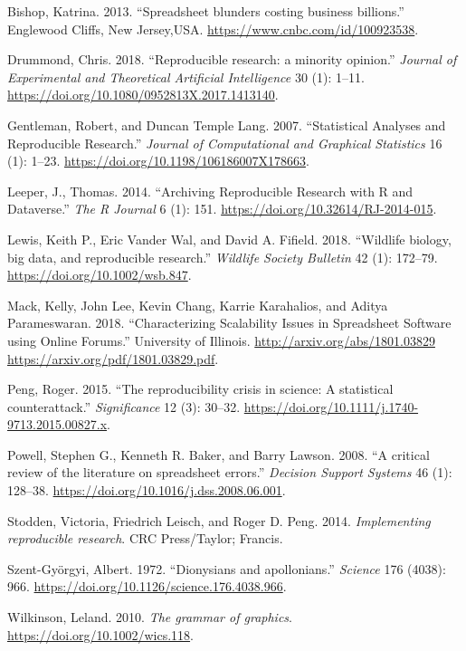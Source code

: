\documentclass[smallextended]{svjour3}       %
\newlength{\cslhangindent}
\newlength{\cslentryspacingunit} %
\newenvironment{CSLReferences}[2] %
 {%
  \setlength{\parindent}{0pt}
  \ifodd #1
  \let\oldpar\par
  \def\par{\hangindent=\cslhangindent\oldpar}
  \fi
  \setlength{\parskip}{#2\cslentryspacingunit}
 }%
 {}
\begin{document}
\hypertarget{refs}{}
\begin{CSLReferences}{1}{0}
\leavevmode{}%
Bishop, Katrina. 2013. {``{Spreadsheet blunders costing business
billions}.''} Englewood Cliffs, New Jersey,USA.
\url{https://www.cnbc.com/id/100923538}.

\leavevmode{}%
Drummond, Chris. 2018. {``{Reproducible research: a minority
opinion}.''} \emph{Journal of Experimental and Theoretical Artificial
Intelligence} 30 (1): 1--11.
\url{https://doi.org/10.1080/0952813X.2017.1413140}.

\leavevmode{}%
Gentleman, Robert, and Duncan Temple Lang. 2007. {``{Statistical
Analyses and Reproducible Research}.''} \emph{Journal of Computational
and Graphical Statistics} 16 (1): 1--23.
\url{https://doi.org/10.1198/106186007X178663}.

\leavevmode{}%
Leeper, J., Thomas. 2014. {``{Archiving Reproducible Research with R and
Dataverse}.''} \emph{The R Journal} 6 (1): 151.
\url{https://doi.org/10.32614/RJ-2014-015}.

\leavevmode{}%
Lewis, Keith P., Eric Vander Wal, and David A. Fifield. 2018.
{``{Wildlife biology, big data, and reproducible research}.''}
\emph{Wildlife Society Bulletin} 42 (1): 172--79.
\url{https://doi.org/10.1002/wsb.847}.

\leavevmode{}%
Mack, Kelly, John Lee, Kevin Chang, Karrie Karahalios, and Aditya
Parameswaran. 2018. {``{Characterizing Scalability Issues in Spreadsheet
Software using Online Forums}.''} University of Illinois.
\href{http://arxiv.org/abs/1801.03829\%20https://arxiv.org/pdf/1801.03829.pdf}{http://arxiv.org/abs/1801.03829
https://arxiv.org/pdf/1801.03829.pdf}.

\leavevmode{}%
Peng, Roger. 2015. {``{The reproducibility crisis in science: A
statistical counterattack}.''} \emph{Significance} 12 (3): 30--32.
\url{https://doi.org/10.1111/j.1740-9713.2015.00827.x}.

\leavevmode{}%
Powell, Stephen G., Kenneth R. Baker, and Barry Lawson. 2008. {``{A
critical review of the literature on spreadsheet errors}.''}
\emph{Decision Support Systems} 46 (1): 128--38.
\url{https://doi.org/10.1016/j.dss.2008.06.001}.

\leavevmode{}%
Stodden, Victoria, Friedrich Leisch, and Roger D. Peng. 2014.
\emph{{Implementing reproducible research}}. CRC Press/Taylor; Francis.

\leavevmode{}%
Szent-Györgyi, Albert. 1972. {``{Dionysians and apollonians}.''}
\emph{Science} 176 (4038): 966.
\url{https://doi.org/10.1126/science.176.4038.966}.

\leavevmode{}%
Wilkinson, Leland. 2010. \emph{{The grammar of graphics}}.
\url{https://doi.org/10.1002/wics.118}.

\end{CSLReferences}




\end{document}
